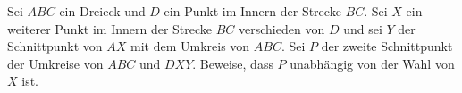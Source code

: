 Sei $ABC$ ein Dreieck und $D$ ein Punkt im Innern der Strecke $BC$. Sei $X$ ein weiterer Punkt im Innern der Strecke $BC$ verschieden von $D$ und sei $Y$ der Schnittpunkt von $AX$ mit  dem Umkreis von $ABC$. Sei $P$ der zweite Schnittpunkt der Umkreise von $ABC$ und $DXY$. Beweise, dass $P$ unabhängig von der Wahl von $X$ ist.